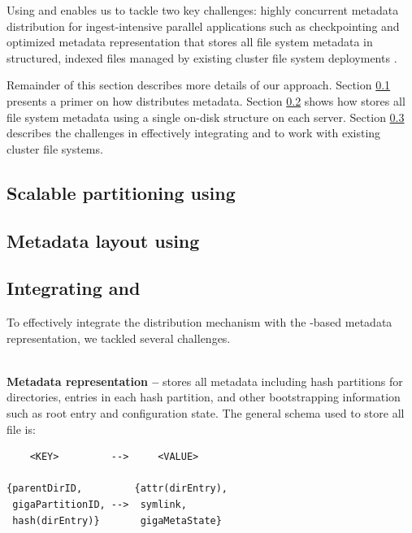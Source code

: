 Using \giga{} and \ldb{} enables us to tackle two key challenges: highly 
concurrent metadata distribution for ingest-intensive parallel applications
such as checkpointing \cite{PLFS} and 
optimized metadata representation that stores all file system
metadata in structured, indexed files managed by existing cluster file system
deployments \cite{LevelDB}. 

Remainder of this section describes more details of our approach. 
Section \ref{design.giga} presents a primer on how \giga{} distributes 
metadata. 
Section \ref{design.tablefs} shows how \ldb{} stores all file system metadata
using a single on-disk structure on each server. 
Section \ref{design.integration} describes the challenges in effectively
integrating \giga{} and \ldb{} to work with existing cluster file systems.

\subsection{Scalable partitioning using \giga{}}
\label{design.giga}


\subsection{Metadata layout using \ldb{}}
\label{design.tablefs}


\subsection{Integrating \giga{} and \ldb{}}
\label{design.integration}

To effectively integrate the \giga{} distribution mechanism with the
\ldb{}-based metadata representation, we tackled several challenges. 

~\\
\textbf{Metadata representation -- }
\ldb{} stores all metadata including \giga{} hash
partitions for directories, entries in each hash partition, and other
bootstrapping information such as root entry and \giga{} configuration state.
The general schema used to store all file is:

\begin{verbatim}
    <KEY>         -->     <VALUE> 

{parentDirID,         {attr(dirEntry),
 gigaPartitionID, -->  symlink,
 hash(dirEntry)}       gigaMetaState}
\end{verbatim}

